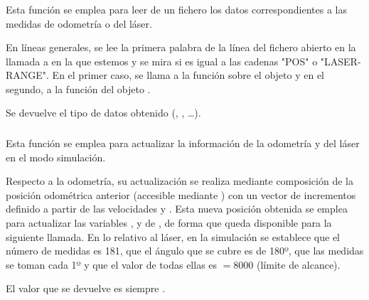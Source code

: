 \subsubsection{}

\noindent
{}

\noindent
Esta función se emplea para leer de un fichero los datos correspondientes a las medidas de odometría o del láser.

\noindent
En líneas generales, se lee la primera palabra de la línea del fichero abierto en la llamada a  en la que estemos y se mira si es igual a las cadenas "POS" o "LASER-RANGE". En el primer caso, se llama a la función  sobre el objeto  y en el segundo, a la función  del objeto .

\noindent
Se devuelve el tipo de datos obtenido (, , \ldots).

\subsubsection{}

\noindent
{}

\noindent
Esta función se emplea para actualizar la información de la odometría y del láser en el modo simulación.

\noindent
Respecto a la odometría, su actualización se realiza mediante composición de la posición odométrica anterior (accesible mediante ) con un vector de incrementos definido a partir de las velocidades  y . Esta nueva posición obtenida se emplea para actualizar las variables ,  y  de , de forma que queda disponible para la siguiente llamada. En lo relativo al láser, en la simulación se establece que el número de medidas es 181, que el ángulo que se cubre es de 180º, que las medidas se toman cada 1º y que el valor de todas ellas es  $= 8000$ (límite de alcance).

\noindent
El valor que se devuelve es siempre .

\subsubsection{}

\noindent
{}

